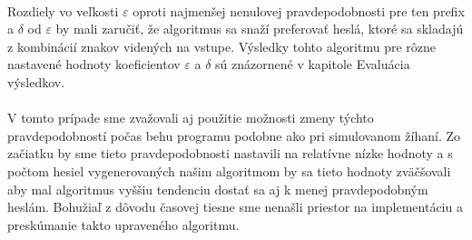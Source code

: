 \paragraph{}
Rozdiely vo veľkosti \(\varepsilon\) oproti najmenšej nenulovej pravdepodobnosti pre ten prefix a \(\delta\) od \(\varepsilon\) by mali zaručiť, že algoritmus sa snaží preferovať heslá, ktoré sa skladajú z kombinácií znakov videných na vstupe. Výsledky tohto algoritmu pre rôzne nastavené hodnoty koeficientov \(\varepsilon\) a \(\delta\) sú znázornené v kapitole Evaluácia výsledkov.

\paragraph{}
V tomto prípade sme zvažovali aj použitie možnosti zmeny týchto pravdepodobností počas behu programu podobne ako pri simulovanom žíhaní. Zo začiatku by sme tieto pravdepodobnosti nastavili na relatívne nízke hodnoty a s počtom hesiel vygenerovaných našim algoritmom by sa tieto hodnoty zväčšovali aby mal algoritmus vyššiu tendenciu dostať sa aj k menej pravdepodobným heslám. Bohužiaľ z dôvodu časovej tiesne sme nenašli priestor na implementáciu a preskúmanie takto upraveného algoritmu.
